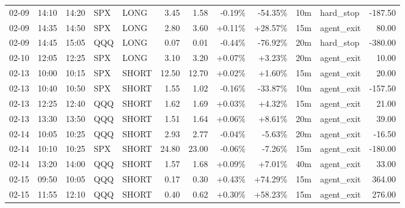 \documentclass[11pt,a4paper]{article}
\begin{document}
\begin{center}
\begin{longtable}{>{\color{txtmain}}l l l l l r r r r r >{\color{txtmain}}l r}
02-09 & 14:10 & 14:20 & SPX & LONG & 3.45 & 1.58 & \textcolor{lossred}{-0.19\%} & \textcolor{lossred}{-54.35\%} & 10m & hard\_stop & \textcolor{lossred}{-187.50} \\
02-09 & 14:35 & 14:50 & SPX & LONG & 2.80 & 3.60 & \textcolor{wingreen}{+0.11\%} & \textcolor{wingreen}{+28.57\%} & 15m & agent\_exit & \textcolor{wingreen}{80.00} \\
02-09 & 14:45 & 15:05 & QQQ & LONG & 0.07 & 0.01 & \textcolor{lossred}{-0.44\%} & \textcolor{lossred}{-76.92\%} & 20m & hard\_stop & \textcolor{lossred}{-380.00} \\
02-10 & 12:05 & 12:25 & SPX & LONG & 3.10 & 3.20 & \textcolor{wingreen}{+0.07\%} & \textcolor{wingreen}{+3.23\%} & 20m & agent\_exit & \textcolor{wingreen}{10.00} \\
02-13 & 10:00 & 10:15 & SPX & SHORT & 12.50 & 12.70 & \textcolor{wingreen}{+0.02\%} & \textcolor{wingreen}{+1.60\%} & 15m & agent\_exit & \textcolor{wingreen}{20.00} \\
02-13 & 10:40 & 10:50 & SPX & SHORT & 1.55 & 1.02 & \textcolor{lossred}{-0.16\%} & \textcolor{lossred}{-33.87\%} & 10m & agent\_exit & \textcolor{lossred}{-157.50} \\
02-13 & 12:25 & 12:40 & QQQ & SHORT & 1.62 & 1.69 & \textcolor{wingreen}{+0.03\%} & \textcolor{wingreen}{+4.32\%} & 15m & agent\_exit & \textcolor{wingreen}{21.00} \\
02-13 & 13:30 & 13:50 & QQQ & SHORT & 1.51 & 1.64 & \textcolor{wingreen}{+0.06\%} & \textcolor{wingreen}{+8.61\%} & 20m & agent\_exit & \textcolor{wingreen}{39.00} \\
02-14 & 10:05 & 10:25 & QQQ & SHORT & 2.93 & 2.77 & \textcolor{lossred}{-0.04\%} & \textcolor{lossred}{-5.63\%} & 20m & agent\_exit & \textcolor{lossred}{-16.50} \\
02-14 & 10:10 & 10:25 & SPX & SHORT & 24.80 & 23.00 & \textcolor{lossred}{-0.06\%} & \textcolor{lossred}{-7.26\%} & 15m & agent\_exit & \textcolor{lossred}{-180.00} \\
02-14 & 13:20 & 14:00 & QQQ & SHORT & 1.57 & 1.68 & \textcolor{wingreen}{+0.09\%} & \textcolor{wingreen}{+7.01\%} & 40m & agent\_exit & \textcolor{wingreen}{33.00} \\
02-15 & 09:50 & 10:05 & QQQ & SHORT & 0.17 & 0.30 & \textcolor{wingreen}{+0.43\%} & \textcolor{wingreen}{+74.29\%} & 15m & agent\_exit & \textcolor{wingreen}{364.00} \\
02-15 & 11:55 & 12:10 & QQQ & SHORT & 0.40 & 0.62 & \textcolor{wingreen}{+0.30\%} & \textcolor{wingreen}{+58.23\%} & 15m & agent\_exit & \textcolor{wingreen}{276.00} \\

\end{longtable}
\end{center}
\end{document}
